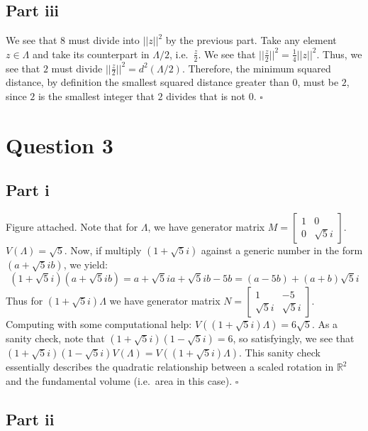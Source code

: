 \documentclass[letterpaper]{article}
\newcommand*{\QED}{\hfill\ensuremath{\square}}%
\begin{document}
\subsection{Part iii}
\label{sub:2Partiii}

We see that $ 8 $ must divide into $ ||z||^2 $ by the previous part.
Take any element $ z \in \Lambda $ and take its counterpart in $ \Lambda / 2 $, i.e.\ $ \frac{z}{2} $.
We see that $ ||\frac{z}{2}||^2 = \frac{1}{4} ||z||^2 $.
Thus, we see that $ 2 $ must divide $ ||\frac{z}{2}||^2 = d^2 (\Lambda / 2) $.
Therefore, the minimum squared distance, by definition the smallest squared distance greater than $ 0 $, must be $ 2 $, since $ 2 $ is the smallest integer that $ 2 $ divides that is not $ 0 $.
\QED{}

\section{Question 3}
\label{sec:Question3}

\subsection{Part i}
\label{sub:3Parti}

Figure attached.
Note that for $ \Lambda $, we have generator matrix $ M = \begin{bmatrix} 1 & 0 \\ 0 & \sqrt{5} i \end{bmatrix} $.
$ V(\Lambda) = \sqrt{5} $.
Now, if multiply $ (1 + \sqrt{5} i) $ against a generic number in the form $ (a + \sqrt{5} i b) $, we yield:
$$ (1 + \sqrt{5} i)(a + \sqrt{5} i b) = a + \sqrt{5} i a + \sqrt{5} i b - 5b = (a - 5b) + (a + b) \sqrt{5} i $$
Thus for $ (1 + \sqrt{5} i)\Lambda $ we have generator matrix $ N = \begin{bmatrix} 1 & -5 \\ \sqrt{5} i & \sqrt{5} i \end{bmatrix} $.
Computing with some computational help: $ V((1 + \sqrt{5} i)\Lambda) = 6 \sqrt{5} $.
As a sanity check, note that $ (1 + \sqrt{5} i) (1 - \sqrt{5} i) = 6 $, so satisfyingly, we see that $ (1 + \sqrt{5} i) (1 - \sqrt{5} i) V(\Lambda) = V((1 + \sqrt{5} i)\Lambda) $.
This sanity check essentially describes the quadratic relationship between a scaled rotation in $ \mathbb{R}^2 $ and the fundamental volume (i.e.\ area in this case).
\QED{}

\subsection{Part ii}
\label{sub:3Partii}
\end{document}

